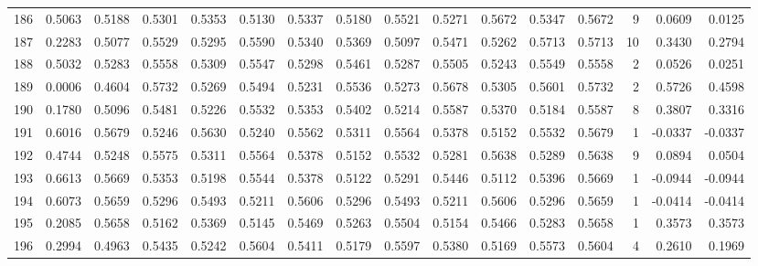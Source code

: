 \begin{tabular}{lrrrrrrrrrrrrrrr}
186 &      0.5063 &  0.5188 &  0.5301 &  0.5353 &  0.5130 &  0.5337 &  0.5180 &  0.5521 &  0.5271 &  0.5672 &   0.5347 &     0.5672 &      9 &                    0.0609 &                     0.0125 \\
187 &      0.2283 &  0.5077 &  0.5529 &  0.5295 &  0.5590 &  0.5340 &  0.5369 &  0.5097 &  0.5471 &  0.5262 &   0.5713 &     0.5713 &     10 &                    0.3430 &                     0.2794 \\
188 &      0.5032 &  0.5283 &  0.5558 &  0.5309 &  0.5547 &  0.5298 &  0.5461 &  0.5287 &  0.5505 &  0.5243 &   0.5549 &     0.5558 &      2 &                    0.0526 &                     0.0251 \\
189 &      0.0006 &  0.4604 &  0.5732 &  0.5269 &  0.5494 &  0.5231 &  0.5536 &  0.5273 &  0.5678 &  0.5305 &   0.5601 &     0.5732 &      2 &                    0.5726 &                     0.4598 \\
190 &      0.1780 &  0.5096 &  0.5481 &  0.5226 &  0.5532 &  0.5353 &  0.5402 &  0.5214 &  0.5587 &  0.5370 &   0.5184 &     0.5587 &      8 &                    0.3807 &                     0.3316 \\
191 &      0.6016 &  0.5679 &  0.5246 &  0.5630 &  0.5240 &  0.5562 &  0.5311 &  0.5564 &  0.5378 &  0.5152 &   0.5532 &     0.5679 &      1 &                   -0.0337 &                    -0.0337 \\
192 &      0.4744 &  0.5248 &  0.5575 &  0.5311 &  0.5564 &  0.5378 &  0.5152 &  0.5532 &  0.5281 &  0.5638 &   0.5289 &     0.5638 &      9 &                    0.0894 &                     0.0504 \\
193 &      0.6613 &  0.5669 &  0.5353 &  0.5198 &  0.5544 &  0.5378 &  0.5122 &  0.5291 &  0.5446 &  0.5112 &   0.5396 &     0.5669 &      1 &                   -0.0944 &                    -0.0944 \\
194 &      0.6073 &  0.5659 &  0.5296 &  0.5493 &  0.5211 &  0.5606 &  0.5296 &  0.5493 &  0.5211 &  0.5606 &   0.5296 &     0.5659 &      1 &                   -0.0414 &                    -0.0414 \\
195 &      0.2085 &  0.5658 &  0.5162 &  0.5369 &  0.5145 &  0.5469 &  0.5263 &  0.5504 &  0.5154 &  0.5466 &   0.5283 &     0.5658 &      1 &                    0.3573 &                     0.3573 \\
196 &      0.2994 &  0.4963 &  0.5435 &  0.5242 &  0.5604 &  0.5411 &  0.5179 &  0.5597 &  0.5380 &  0.5169 &   0.5573 &     0.5604 &      4 &                    0.2610 &                     0.1969 \\

\end{tabular}
